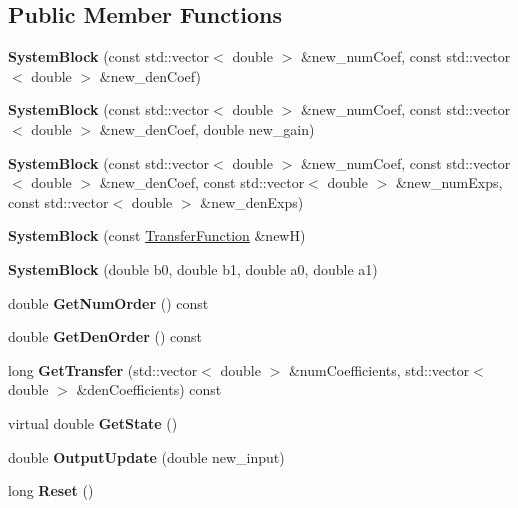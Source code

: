 \subsection*{Public Member Functions}
\begin{DoxyCompactItemize}
\item 
\mbox{\label{classSystemBlock_a97f55d7953f7a07d8c2290d5039fa5b6}} 
{\bfseries System\+Block} (const std\+::vector$<$ double $>$ \&new\+\_\+num\+Coef, const std\+::vector$<$ double $>$ \&new\+\_\+den\+Coef)
\item 
\mbox{\label{classSystemBlock_a2f513f638f6f177b611f8bdd42fc357d}} 
{\bfseries System\+Block} (const std\+::vector$<$ double $>$ \&new\+\_\+num\+Coef, const std\+::vector$<$ double $>$ \&new\+\_\+den\+Coef, double new\+\_\+gain)
\item 
\mbox{\label{classSystemBlock_aebc24f49318e27ce761c34335ee6fe63}} 
{\bfseries System\+Block} (const std\+::vector$<$ double $>$ \&new\+\_\+num\+Coef, const std\+::vector$<$ double $>$ \&new\+\_\+den\+Coef, const std\+::vector$<$ double $>$ \&new\+\_\+num\+Exps, const std\+::vector$<$ double $>$ \&new\+\_\+den\+Exps)
\item 
\mbox{\label{classSystemBlock_ac67265b0f826a3fdaf368ba369260c6b}} 
{\bfseries System\+Block} (const \hyperlink{classTransferFunction}{Transfer\+Function} \&newH)
\item 
\mbox{\label{classSystemBlock_a47f1d89600cf61345ca525d90f8d6d6c}} 
{\bfseries System\+Block} (double b0, double b1, double a0, double a1)
\item 
\mbox{\label{classSystemBlock_a9d9ce9707e97752cb79b7200381fd5eb}} 
double {\bfseries Get\+Num\+Order} () const
\item 
\mbox{\label{classSystemBlock_aafa63d22e9bc04dfd6785c82fb624c1b}} 
double {\bfseries Get\+Den\+Order} () const
\item 
\mbox{\label{classSystemBlock_ac5d4ba30215886e134be5b708d26a85a}} 
long {\bfseries Get\+Transfer} (std\+::vector$<$ double $>$ \&num\+Coefficients, std\+::vector$<$ double $>$ \&den\+Coefficients) const
\item 
\mbox{\label{classSystemBlock_ad151469a821fa0ec313d5437cb75a6d6}} 
virtual double {\bfseries Get\+State} ()
\item 
\mbox{\label{classSystemBlock_a2f74c572b6a9527b6b5bde03ba8ab9e6}} 
double {\bfseries Output\+Update} (double new\+\_\+input)
\item 
\mbox{\label{classSystemBlock_a6162ac92f0d85ff36bff5210cb220871}} 
long {\bfseries Reset} ()
\end{DoxyCompactItemize}
